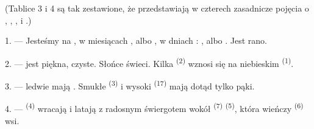 %
%
%

\VUsaut{3.0mm}
\VUsaut{1.6mm}
\VUsaut{3.4mm}

(Tablice 3 i 4 są tak zestawione, że przedstawiają w czterech  zasadnicze pojęcia o , , ,
 i .)
\VUsaut{4.0mm}

\VUsaut{3.0mm}

\VUsaut{2.4mm}

\VUsaut{3.0mm}

1. --- Jesteśmy na , w miesiącach ,  albo
, w dniach : ,  albo
. Jest  rano.

2. ---  jest piękna,  czyste. Słońce świeci. Kilka
 \textsuperscript{(2)} wznosi się na niebieskim 
\textsuperscript{(1)}.

3. ---  ledwie mają . Smukłe 
\textsuperscript{(3)} i wysoki  \textsuperscript{(17)} mają dotąd tylko
pąki.

4. ---  \textsuperscript{(4)} wracają i latają z radosnym świergotem
wokół  \textsuperscript{(7)}  \textsuperscript{(5)},
która wieńczy  \textsuperscript{(6)} wsi.


